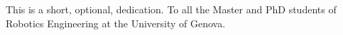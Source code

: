 
\begin{dedication}

\begin{flushright}
This is a short, optional, dedication.
To all the Master and PhD students of Robotics Engineering at the University of Genova.
\end{flushright}

\end{dedication}


